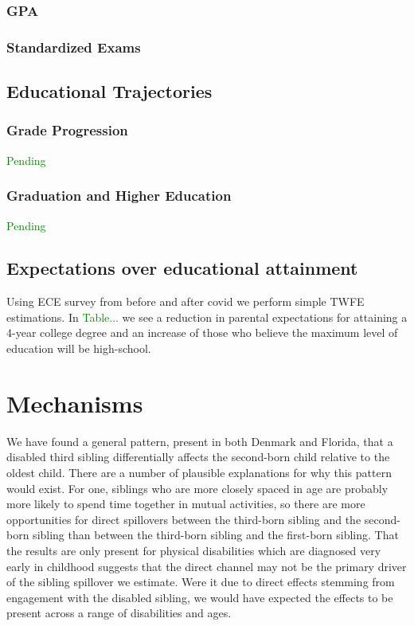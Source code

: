 \subsubsection{GPA}

\subsubsection{Standardized Exams}

\subsection{Educational Trajectories}

\subsubsection{Grade Progression}

\textcolor{green}{Pending}

\subsubsection{Graduation and Higher Education}

\textcolor{green}{Pending}

\subsection{Expectations over educational attainment}

Using ECE survey from before and after covid we perform simple TWFE estimations. In \textcolor{green}{Table...} we see a reduction in parental expectations for attaining a 4-year college degree and an increase of those who believe the maximum level of education will be high-school.


\section{Mechanisms}\label{sec:mechanisms}

We have found a general pattern, present in both Denmark and Florida, that a disabled third sibling differentially affects the second-born child relative to the oldest child. There are a number of plausible explanations for why this pattern would exist. For one, siblings who are more closely spaced in age are probably more likely to spend time together in mutual activities, so there are more opportunities for direct spillovers between the third-born sibling and the second-born sibling than between the third-born sibling and the first-born sibling. That the results are only present for physical disabilities which are diagnosed very early in childhood suggests that the direct channel may not be the primary driver of the sibling spillover we estimate. Were it due to direct effects stemming from engagement with the disabled sibling, we would have expected the effects to be present across a range of disabilities and ages.

